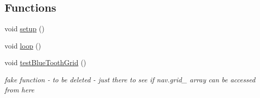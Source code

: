 \subsection*{Functions}
\begin{DoxyCompactItemize}
\item 
void \mbox{\hyperlink{bot_main_8ino_a4fc01d736fe50cf5b977f755b675f11d}{setup}} ()
\item 
void \mbox{\hyperlink{bot_main_8ino_afe461d27b9c48d5921c00d521181f12f}{loop}} ()
\item 
void \mbox{\hyperlink{bot_main_8ino_a8e570cfb3e7e7e8306ab7c755345c5b8}{test\+Blue\+Tooth\+Grid}} ()
\begin{DoxyCompactList}\small\item\em fake function -\/ to be deleted -\/ just there to see if nav.\+grid\+\_\+ array can be accessed from here \end{DoxyCompactList}\end{DoxyCompactItemize}
